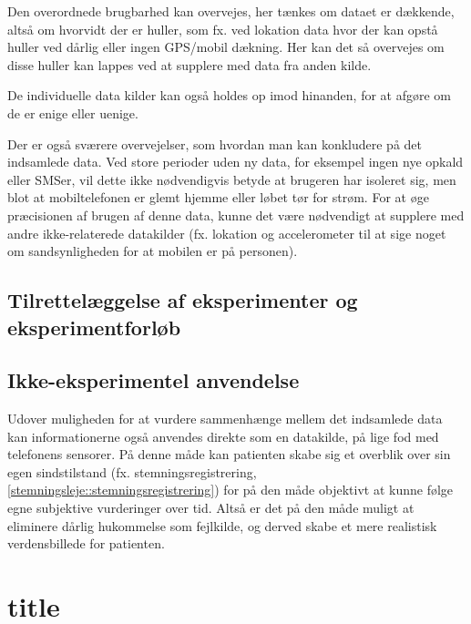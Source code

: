 Den overordnede brugbarhed kan overvejes, her tænkes om dataet er dækkende, altså om hvorvidt der er huller, som fx. ved lokation data hvor der kan opstå huller ved dårlig eller ingen GPS/mobil dækning.
Her kan det så overvejes om disse huller kan lappes ved at supplere med data fra anden kilde.

De individuelle data kilder kan også holdes op imod hinanden, for at afgøre om de er enige eller uenige.

Der er også sværere overvejelser, som hvordan man kan konkludere på det indsamlede data.
Ved store perioder uden ny data, for eksempel ingen nye opkald eller SMSer, vil dette ikke nødvendigvis betyde at brugeren har isoleret sig, men blot at mobiltelefonen er glemt hjemme eller løbet tør for strøm.
For at øge præcisionen af brugen af denne data, kunne det være nødvendigt at supplere med andre ikke-relaterede datakilder (fx. lokation og accelerometer til at sige noget om sandsynligheden for at mobilen er på personen).

\subsection{Tilrettelæggelse af eksperimenter og eksperimentforløb}

\subsection{Ikke-eksperimentel anvendelse}
Udover muligheden for at vurdere sammenhænge mellem det indsamlede data kan informationerne også anvendes direkte som en datakilde, på lige fod med telefonens sensorer.
På denne måde kan patienten skabe sig et overblik over sin egen sindstilstand (fx. stemningsregistrering, \cref{stemningsleje::stemningsregistrering}) for på den måde objektivt at kunne følge egne subjektive vurderinger over tid.
Altså er det på den måde muligt at eliminere dårlig hukommelse som fejlkilde, og derved skabe et mere realistisk verdensbillede for patienten.

\section{title}
